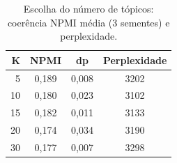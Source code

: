 \begin{table}[t]\centering\small
\caption{Escolha do número de tópicos: coerência NPMI média (3 sementes) e perplexidade.}\label{tab:k}
\begin{tabular}{rccc}
\toprule
K & NPMI & dp & Perplexidade \\
\midrule
5 & 0,189 & 0,008 & 3202 \\
10 & 0,180 & 0,023 & 3102 \\
15 & 0,182 & 0,011 & 3133 \\
20 & 0,174 & 0,034 & 3190 \\
30 & 0,177 & 0,007 & 3298 \\
\bottomrule
\end{tabular}
\end{table}

